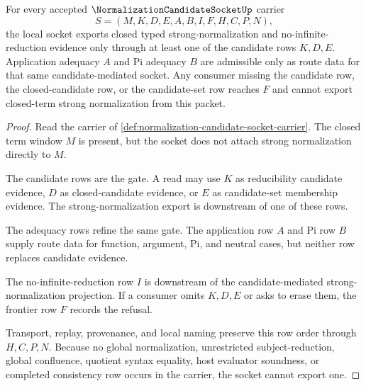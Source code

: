 \begin{theorem}
\label{thm:normalization-candidate-socket-boundary}
For every accepted $\NormalizationCandidateSocketUp$ carrier
$$
S=(M,K,D,E,A,B,I,F,H,C,P,N),
$$
the local socket exports closed typed strong-normalization and no-infinite-reduction evidence only through at least one of the candidate rows $K,D,E$. Application adequacy $A$ and Pi adequacy $B$ are admissible only as route data for that same candidate-mediated socket. Any consumer missing the candidate row, the closed-candidate row, or the candidate-set row reaches $F$ and cannot export closed-term strong normalization from this packet.
\end{theorem}
\begin{proof}
Read the carrier of \autoref{def:normalization-candidate-socket-carrier}. The closed term window $M$ is present, but the socket does not attach strong normalization directly to $M$.

The candidate rows are the gate. A read may use $K$ as reducibility candidate evidence, $D$ as closed-candidate evidence, or $E$ as candidate-set membership evidence. The strong-normalization export is downstream of one of these rows.

The adequacy rows refine the same gate. The application row $A$ and Pi row $B$ supply route data for function, argument, Pi, and neutral cases, but neither row replaces candidate evidence.

The no-infinite-reduction row $I$ is downstream of the candidate-mediated strong-normalization projection. If a consumer omits $K,D,E$ or asks to erase them, the frontier row $F$ records the refusal.

Transport, replay, provenance, and local naming preserve this row order through $H,C,P,N$. Because no global normalization, unrestricted subject-reduction, global confluence, quotient syntax equality, host evaluator soundness, or completed consistency row occurs in the carrier, the socket cannot export one.
\end{proof}

